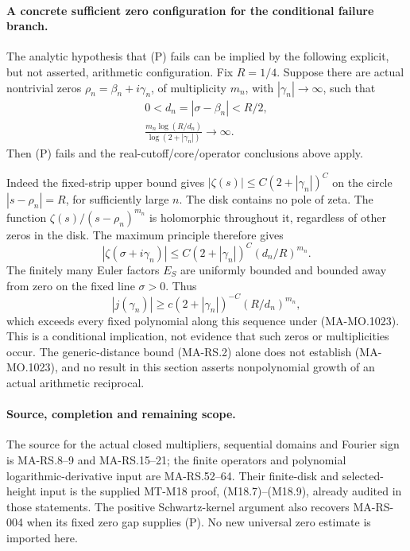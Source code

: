 \paragraph{A concrete sufficient zero configuration for the conditional failure branch.}
The analytic hypothesis that (P) fails can be implied
by the following explicit, but not asserted, arithmetic
configuration.  Fix \(R=1/4\).  Suppose there are
actual nontrivial zeros
\(\rho_n=\beta_n+i\gamma_n\), of multiplicity \(m_n\),
with \(|\gamma_n|\to\infty\), such that
\[
 \begin{gathered}
 0<d_n=|\sigma-\beta_n|<R/2,\\
 \frac{m_n\log(R/d_n)}
                   {\log(2+|\gamma_n|)}\longrightarrow\infty .
 \end{gathered}
\tag{MA-MO.1023}
\]
Then (P) fails and the real-cutoff/core/operator
conclusions above apply.

Indeed the fixed-strip upper bound gives
\(|\zeta(s)|\le C(2+|\gamma_n|)^C\) on the
circle \(|s-\rho_n|=R\), for sufficiently large
\(n\).  The disk contains no pole of zeta.
The function \(\zeta(s)/(s-\rho_n)^{m_n}\)
is holomorphic throughout it, regardless of
other zeros in the disk.  The maximum principle
therefore gives
\[
 |\zeta(\sigma+i\gamma_n)|
        \le C(2+|\gamma_n|)^C(d_n/R)^{m_n}.
\tag{MA-MO.1024}
\]
The finitely many Euler factors \(E_S\) are
uniformly bounded and bounded away from zero
on the fixed line \(\sigma>0\).  Thus
\[
 |j(\gamma_n)|
       \ge c(2+|\gamma_n|)^{-C}(R/d_n)^{m_n},
\tag{MA-MO.1025}
\]
which exceeds every fixed polynomial along
this sequence under (MA-MO.1023).
This is a conditional implication, not evidence
that such zeros or multiplicities occur.
The generic-distance bound (MA-RS.2) alone
does not establish (MA-MO.1023), and no result
in this section asserts nonpolynomial growth
of an actual arithmetic reciprocal.

\paragraph{Source, completion and remaining scope.}
The source for the actual closed multipliers,
sequential domains and Fourier sign is
MA-RS.8--9 and MA-RS.15--21; the finite
operators and polynomial logarithmic-derivative
input are MA-RS.52--64.  Their finite-disk
and selected-height input is the supplied
MT-M18 proof, (M18.7)--(M18.9), already
audited in those statements.  The positive
Schwartz-kernel argument also recovers
MA-RS-004 when its fixed zero gap supplies
(P).  No new universal zero estimate is
imported here.

